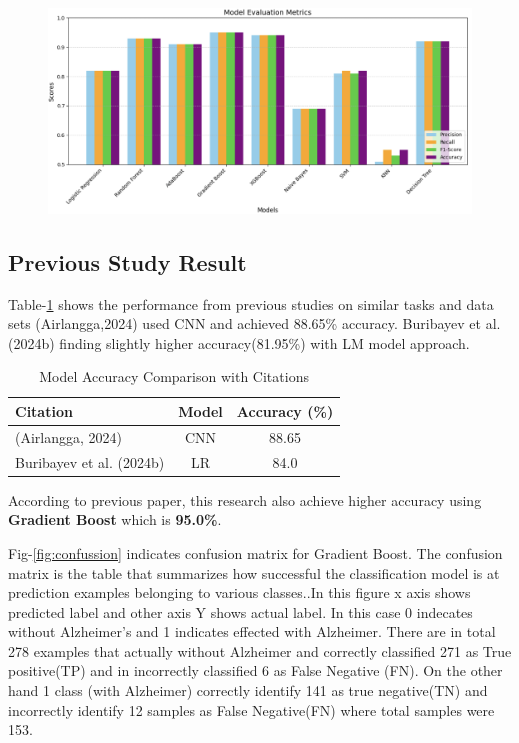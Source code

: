 \documentclass[conference]{IEEEtran} %
\begin{document}
\begin{figure}[ht]
    \centering
    \includegraphics[width=\linewidth]{Fig-05.png}
    \caption{}
    \label{fig:evaluation}
\end{figure}
\FloatBarrier

\subsection{Previous Study Result}
Table-\ref{tab:previousres} shows the performance from previous studies on similar tasks and data sets (Airlangga,2024)\cite{com1} used CNN and achieved 88.65\% accuracy. Buribayev et al. (2024b)\cite{com2} finding slightly higher accuracy(81.95\%) with LM model approach.


\begin{table}[]
\centering
\caption{Model Accuracy Comparison with Citations}
\label{tab:previousres}
\begin{tabular}{lcc}
\hline
\textbf{Citation}                                  & \textbf{Model} & \textbf{Accuracy (\%)} \\ \hline
(Airlangga, 2024)\cite{com1}        & CNN            & 88.65                  \\
Buribayev et al. (2024b)\cite{com2} & LR             & 84.0                   \\ \hline
\end{tabular}
\end{table}
\FloatBarrier

According to previous paper, this research also achieve higher accuracy using \textbf{Gradient Boost} which is \textbf{95.0\%}.

Fig-\ref{fig:confussion} indicates confusion matrix for Gradient Boost. The confusion matrix is the table that summarizes how successful the classification model is at prediction examples belonging to various classes.\cite{ref4}.In this figure x axis shows predicted label and other axis Y shows actual label. In this case 0 indecates without Alzheimer's and 1 indicates effected with Alzheimer. There are in total 278 examples that actually without Alzheimer and correctly classified 271 as True positive(TP) and in incorrectly classified 6 as False Negative (FN). On the other hand 1 class (with Alzheimer) correctly identify 141 as true negative(TN) and incorrectly identify 12 samples as False Negative(FN) where total samples were 153.
\end{document}

